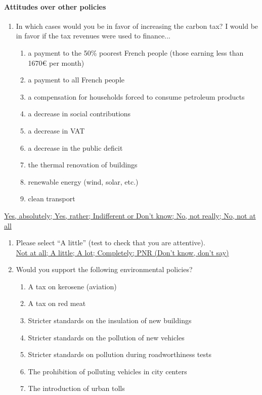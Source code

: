 \documentclass[english,5p,authoryear]{elsarticle}
\begin{document}
\begin{appendices}
\paragraph{Attitudes over other policies}
\begin{enumerate}[resume,leftmargin=*]
\item In which cases would you be in favor of increasing the carbon tax?
I would be in favor if the tax revenues were used to finance...\uline{ }
\begin{enumerate}[resume,leftmargin=*]
\item a payment to the 50\% poorest French people (those earning less than
1670\euro{} per month) 
\item a payment to all French people 
\item a compensation for households forced to consume petroleum products
\item a decrease in social contributions
\item a decrease in VAT 
\item a decrease in the public deficit 
\item the thermal renovation of buildings 
\item renewable energy (wind, solar, etc.) 
\item clean transport
\end{enumerate}
\end{enumerate}
\uline{Yes, absolutely; Yes, rather; Indifferent or Don't know; No,
not really; No, not at all}
\begin{enumerate}[resume,leftmargin=*]
\item Please select ``A little'' (test to check that you are attentive).
\uline{}\\
\uline{Not at all; A little; A lot; Completely; PNR (Don't know, don't
say)} 
\item Would you support the following environmental policies? 
\begin{enumerate}[resume,leftmargin=*]
\item A tax on kerosene (aviation) 
\item A tax on red meat 
\item Stricter standards on the insulation of new buildings 
\item Stricter standards on the pollution of new vehicles
\item Stricter standards on pollution during roadworthiness tests 
\item The prohibition of polluting vehicles in city centers 
\item The introduction of urban tolls 

\end{enumerate}
\end{enumerate}
\end{appendices}
\end{document}
